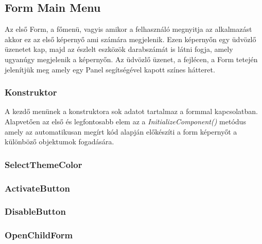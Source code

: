 \documentclass[tocnopagenum]{thesis-ekf}
\theoremstyle{definition}
\theoremstyle{remark}
\begin{document}
	\subsection*{Form Main Menu}
	Az első Form, a főmenü, vagyis amikor a felhasználó megnyitja az alkalmazást akkor ez az első képernyő ami számára megjelenik. 
	Ezen képernyőn egy üdvözlő üzenetet kap, majd az észlelt eszközök darabszámát is látni fogja, amely ugyanúgy megjelenik a képernyőn.
	Az üdvözlő üzenet, a fejlécen, a Form tetején jelenítjük meg amely egy Panel segítségével kapott színes hátteret.
	\subsubsection{Konstruktor}
	A kezdő menünek a konstruktora sok adatot tartalmaz a formmal kapcsolatban. Alapvetően az első és legfontosabb elem az a \textit{InitializeComponent()} metódus amely az automatikusan megírt kód alapján előkészíti a form képernyőt a különböző objektumok fogadására. 
	\subsubsection{SelectThemeColor}
	\subsubsection{ActivateButton}
	\subsubsection{DisableButton}
	\subsubsection{OpenChildForm}
\end{document}
